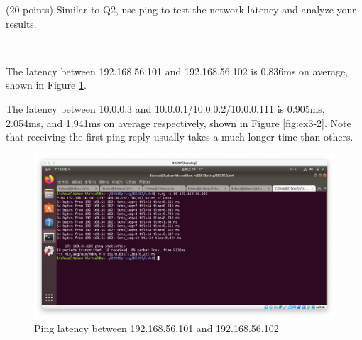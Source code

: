 \begin{exercise}[]{(20 points) Similar to Q2, use ping to test the network latency and analyze your results.}
  \begin{solution}
  \par{~}

  The latency between 192.168.56.101 and 192.168.56.102 is 0.836ms on average, shown in Figure \ref{fig:ex3-1}.

  The latency between 10.0.0.3 and 10.0.0.1/10.0.0.2/10.0.0.111 is 0.905ms, 2.054ms, and 1.941ms on average respectively, shown in Figure \ref{fig:ex3-2}. Note that receiving the first ping reply usually takes a much longer time than others.

    \begin{figure}[ht]
    \begin{center}
    \includegraphics[width=12cm]{img/lab4/ex3-1}
    \caption{Ping latency between 192.168.56.101 and 192.168.56.102}
    \label{fig:ex3-1}
    \end{center}
    \end{figure}



\end{solution}
\end{exercise}
